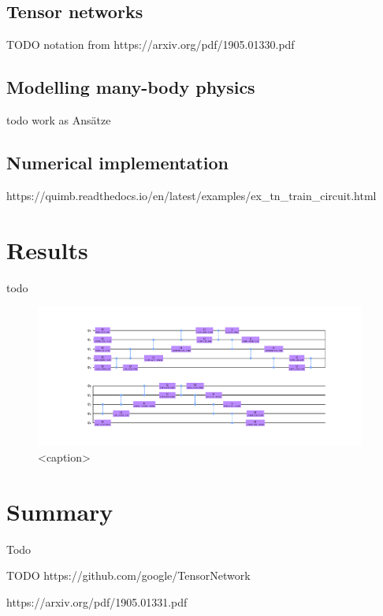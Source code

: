 \subsection{Tensor networks}

TODO notation from https://arxiv.org/pdf/1905.01330.pdf

\subsection{Modelling many-body physics}

todo work as Ansätze


\subsection{Numerical implementation}


https://quimb.readthedocs.io/en/latest/examples/ex_tn_train_circuit.html


\cite{Roberts2019}


\section{Results}

todo


\begin{figure}[htb]
    \centering

    \includegraphics[width=0.97\textwidth]{figures/ansatz_circuit.pdf}

    \caption{<caption>}
    \label{fig:qasm_circuit}
\end{figure}


\section{Summary}

Todo





TODO https://github.com/google/TensorNetwork

https://arxiv.org/pdf/1905.01331.pdf


\newpage
\pagestyle{plain}
\renewcommand*{\bibfont}{\footnotesize}
\printbibliography{}



